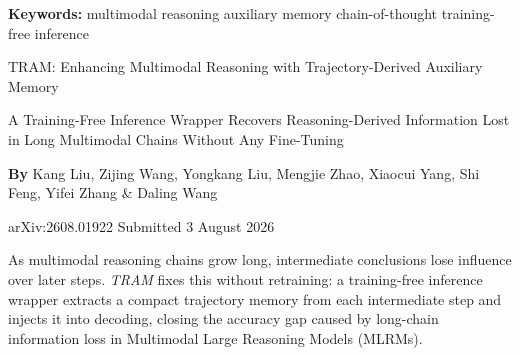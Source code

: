 \documentclass[10pt,twocolumn]{article}
\begin{document}
\setlength{\parindent}{0pt}
\setlength{\parskip}{4pt}

{\small\color{keywordgray}\textbf{Keywords:}
  multimodal reasoning \textbullet{}
  auxiliary memory \textbullet{}
  chain-of-thought \textbullet{}
  training-free inference}\par\vspace{4pt}

{\LARGE\bfseries\raggedright
  TRAM: Enhancing Multimodal Reasoning with Trajectory-Derived Auxiliary Memory}\par\vspace{4pt}

{\large\itshape\raggedright
  A Training-Free Inference Wrapper Recovers Reasoning-Derived Information Lost
  in Long Multimodal Chains Without Any Fine-Tuning}\par\vspace{6pt}

{\small\textbf{By} Kang Liu, Zijing Wang, Yongkang Liu, Mengjie Zhao,
  Xiaocui Yang, Shi Feng, Yifei Zhang \& Daling Wang}\par\vspace{2pt}

{\small\color{keywordgray}arXiv:2608.01922 \textbullet{} Submitted 3 August 2026}
\par\vspace{2pt}\noindent{\color{rulered}\rule{\columnwidth}{0.6pt}}\vspace{6pt}

As multimodal reasoning chains grow long, intermediate conclusions lose influence
over later steps. \textit{TRAM} fixes this without retraining: a training-free
inference wrapper extracts a compact trajectory memory from each intermediate step
and injects it into decoding, closing the accuracy gap caused by long-chain
information loss in Multimodal Large Reasoning Models (MLRMs).
\end{document}
